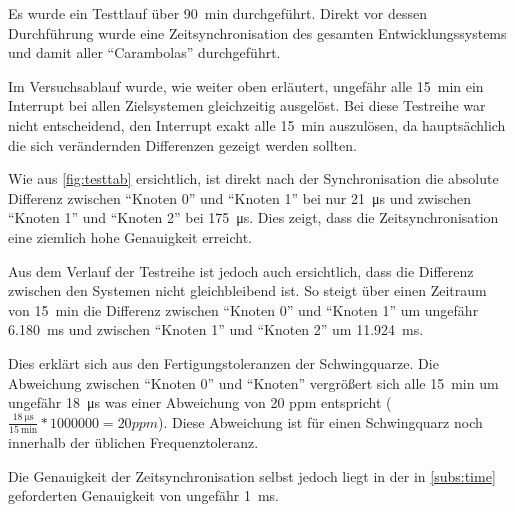 Es wurde ein Testtlauf über \SI{90}{\minute} durchgeführt. Direkt vor dessen
Durchführung wurde eine Zeitsynchronisation des gesamten
Entwicklungssystems und damit aller "`Carambolas"' durchgeführt.

Im Versuchsablauf wurde, wie weiter oben erläutert, ungefähr alle
\SI{15}{\minute} ein Interrupt bei allen Zielsystemen gleichzeitig ausgelöst.
Bei diese Testreihe war nicht entscheidend, den Interrupt exakt alle
\SI{15}{\minute} auszulösen, da hauptsächlich die sich verändernden Differenzen
gezeigt werden sollten.

Wie aus \autoref{fig:testtab} ersichtlich, ist direkt nach der Synchronisation
die absolute Differenz zwischen "`Knoten 0"' und "`Knoten 1"' bei nur
\SI{21}{\us} und zwischen "`Knoten 1"' und "`Knoten 2"' bei \SI{175}{\us}. Dies
zeigt, dass die Zeitsynchronisation eine ziemlich hohe Genauigkeit erreicht.

Aus dem Verlauf der Testreihe ist jedoch auch ersichtlich, dass die Differenz
zwischen den Systemen nicht gleichbleibend ist. So steigt über einen Zeitraum
von \SI{15}{\minute} die Differenz zwischen "`Knoten 0"' und "`Knoten 1"' um
ungefähr \SI{6,180}{\ms} und zwischen "`Knoten 1"' und "`Knoten 2"' um
\SI{11,924}{\ms}.

Dies erklärt sich aus den Fertigungstoleranzen der Schwingquarze. Die Abweichung
zwischen "`Knoten 0"' und "`Knoten"' vergrößert sich alle \SI{15}{\minute} um
ungefähr \SI{18}{\us} was einer Abweichung von 20 ppm entspricht
($\frac{\SI{18}{\us}}{\SI{15}{\minute}}*1000000=20\mathit{ppm}$).
Diese Abweichung ist für einen Schwingquarz noch innerhalb der üblichen
Frequenztoleranz.

Die Genauigkeit der Zeitsynchronisation selbst jedoch liegt in der in
\autoref{subs:time} geforderten Genauigkeit von ungefähr \SI{1}{\ms}.
